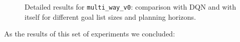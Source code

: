\documentclass[runningheads]{llncs}
\begin{document}
\begin{figure}
  \centering
  \begin{minipage}{.49\linewidth}
    
  \end{minipage}
  \begin{minipage}{.49\linewidth}
    
  \end{minipage}
  
  \begin{minipage}{.49\linewidth}
    
  \end{minipage}
  \begin{minipage}{.49\linewidth}
    
  \end{minipage}

  \caption{Detailed results for \texttt{multi\_way\_v0}: comparison with DQN and with itself for different goal list sizes and planning horizons.}
\end{figure}

As the results of this set of experiments we concluded:
\end{document}
